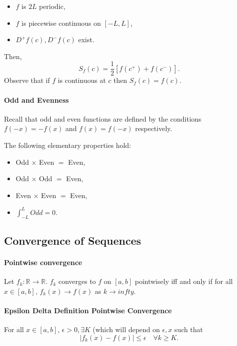 \documentclass[12pt, letterpaper]{article}
\begin{document}
    \begin{itemize}
        \item \(f\) is \(2L\) periodic,
        \item \(f\) is piecewise continuous on \([-L, L]\),
        \item \(D^+f(c), D^-f(c)\) exist.
    \end{itemize}
    
    Then,
    \[
    S_f(c) = \frac{1}{2} [f(c^+) + f(c^-)].
    \]
    Observe that if \(f\) is continuous at \(c\) then \(S_f(c) = f(c)\).

    \paragraph{Odd and Evenness} 
    Recall that odd and even functions are defined by the conditions \(f(-x) = -f(x)\) and \(f(x) = f(-x)\) respectively.

    The following elementary properties hold:
    \begin{itemize}
        \item Odd \(\times\) Even \(=\) Even,
        \item Odd \(\times\) Odd \(=\) Even,
        \item Even \(\times\) Even \(=\) Even,
        \item \(\int_{-L}^L Odd = 0\).
    \end{itemize}

    \subsection{Convergence of Sequences}
    
    \paragraph{Pointwise convergence}
    Let \(f_k: \mathbb{R} \to \mathbb{R}\). \(f_k\) converges to \(f\) on
    \([a, b]\) pointwisely iff and only if for all \(x\in[a,b]\),
    \(f_k(x)\to f(x)\) as \(k\to infty\).

    \paragraph{Epsilon Delta Definition Pointwise Convergence}
    For all \(x\in [a,b]\), \(\epsilon > 0, \exists K\) (which will depend on \(\epsilon, x\) such that
    \[|f_k(x) - f(x)| \leq \epsilon \quad\forall k \geq K.\]
\end{document}
